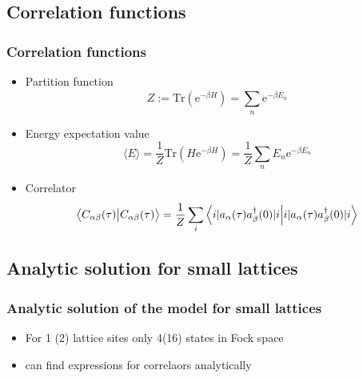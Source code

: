 \documentclass{beamer}
\begin{document}
\subsection{Correlation functions}
\begin{frame}
\frametitle{Correlation functions}
\begin{itemize}
	\item Partition function 
	\begin{equation*}
	Z := \text{Tr}(\text{e}^{-\beta H}) = \sum_{n}^{}\text{e}^{-\beta E_n} \label{partition}
	\end{equation*}
\item Energy expectation value
\begin{equation}
\langle{E}\rangle = \frac{1}{Z}\text{Tr} (H\text{e}^{-\beta H}) =\frac{1}{Z} \sum_{n}^{} E_n\text{e}^{-\beta E_n} \label{energy}
\end{equation}	
\item Correlator
\begin{equation}
\braket{C_{\alpha\beta}(\tau)}= \frac{1}{Z}\sum_{i}^{}\braket{i|a_{\alpha}(\tau)a^{\dagger}_{\beta}(0)|i}	\label{correlator}
\end{equation}
\end{itemize}
\end{frame}
\subsection[Analytic solutions]{Analytic solution for small lattices}
\begin{frame}
\frametitle{Analytic solution of the model for small lattices}
\begin{itemize}
\item For 1 (2) lattice sites only 4(16) states in Fock space
\item can find expressions for correlaors analytically
\end{itemize}
\end{frame}
\end{document}
